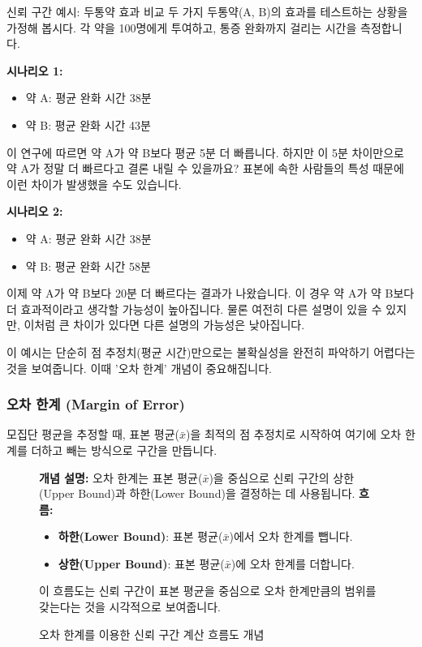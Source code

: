 \documentclass[11pt,a4paper]{article}
\begin{document}
\begin{examplebox}{신뢰 구간 예시: 두통약 효과 비교}
두 가지 두통약(A, B)의 효과를 테스트하는 상황을 가정해 봅시다.
각 약을 100명에게 투여하고, 통증 완화까지 걸리는 시간을 측정합니다.

\textbf{시나리오 1:}
\begin{itemize}
    \item 약 A: 평균 완화 시간 38분
    \item 약 B: 평균 완화 시간 43분
\end{itemize}
이 연구에 따르면 약 A가 약 B보다 평균 5분 더 빠릅니다. 하지만 이 5분 차이만으로 약 A가 정말 더 빠르다고 결론 내릴 수 있을까요? 표본에 속한 사람들의 특성 때문에 이런 차이가 발생했을 수도 있습니다.

\textbf{시나리오 2:}
\begin{itemize}
    \item 약 A: 평균 완화 시간 38분
    \item 약 B: 평균 완화 시간 58분
\end{itemize}
이제 약 A가 약 B보다 20분 더 빠르다는 결과가 나왔습니다. 이 경우 약 A가 약 B보다 더 효과적이라고 생각할 가능성이 높아집니다. 물론 여전히 다른 설명이 있을 수 있지만, 이처럼 큰 차이가 있다면 다른 설명의 가능성은 낮아집니다.

이 예시는 단순히 점 추정치(평균 시간)만으로는 불확실성을 완전히 파악하기 어렵다는 것을 보여줍니다. 이때 '오차 한계' 개념이 중요해집니다.
\end{examplebox}

\subsubsection*{오차 한계 (Margin of Error)}
모집단 평균을 추정할 때, 표본 평균($\bar{x}$)을 최적의 점 추정치로 시작하여 여기에 오차 한계를 더하고 빼는 방식으로 구간을 만듭니다.

\begin{figure}[h!]
  \centering
  \begin{tcolorbox}[colback=gray!10, colframe=gray!50, title=\textbf{오차 한계 흐름도 설명}, sharp corners]
    \textbf{개념 설명:} 오차 한계는 표본 평균($\bar{x}$)을 중심으로 신뢰 구간의 상한(Upper Bound)과 하한(Lower Bound)을 결정하는 데 사용됩니다.
    \textbf{흐름:}
    \begin{itemize}
        \item \textbf{하한(Lower Bound)}: 표본 평균($\bar{x}$)에서 오차 한계를 뺍니다.
        \item \textbf{상한(Upper Bound)}: 표본 평균($\bar{x}$)에 오차 한계를 더합니다.
    \end{itemize}
    이 흐름도는 신뢰 구간이 표본 평균을 중심으로 오차 한계만큼의 범위를 갖는다는 것을 시각적으로 보여줍니다.
  \end{tcolorbox}
  \caption{오차 한계를 이용한 신뢰 구간 계산 흐름도 개념}
  \label{fig:margin_of_error_flowchart}
\end{figure}
\end{document}
